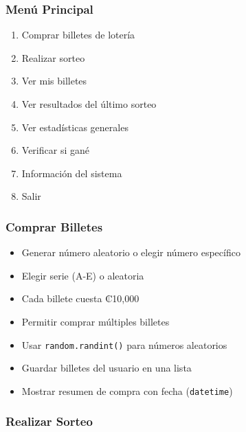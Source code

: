 \documentclass[12pt,a4paper]{article}
\begin{document}
\subsubsection{Menú Principal}

\begin{enumerate}[leftmargin=*]
    \item Comprar billetes de lotería
    \item Realizar sorteo
    \item Ver mis billetes
    \item Ver resultados del último sorteo
    \item Ver estadísticas generales
    \item Verificar si gané
    \item Información del sistema
    \item Salir
\end{enumerate}

\subsubsection{Comprar Billetes}

\begin{itemize}
    \item Generar número aleatorio o elegir número específico
    \item Elegir serie (A-E) o aleatoria
    \item Cada billete cuesta ₡10,000
    \item Permitir comprar múltiples billetes
    \item Usar \texttt{random.randint()} para números aleatorios
    \item Guardar billetes del usuario en una lista
    \item Mostrar resumen de compra con fecha (\texttt{datetime})
\end{itemize}

\subsubsection{Realizar Sorteo}
\end{document}
